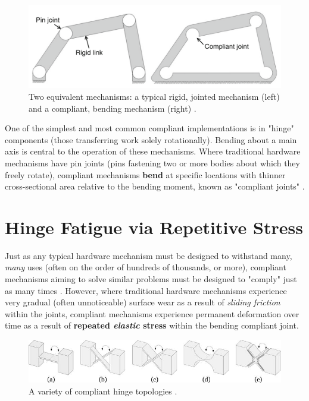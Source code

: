 \documentclass{report}
\begin{document}
\begin{figure}[h]
    \label{fig:wrench}
    \centering
    \includegraphics[width=\textwidth]{images/comparison.png}
    \hfill
    \caption{Two equivalent mechanisms: a typical rigid, jointed mechanism (left) and a compliant, bending mechanism (right) \cite{functionallygradedmaterials}.}
\end{figure}

One of the simplest and most common compliant implementations is in "hinge" components (those transferring work solely rotationally). Bending about a main axis is central to the operation of these mechanisms.
Where traditional hardware mechanisms have pin joints (pins fastening two or more bodies about which they freely rotate), compliant mechanisms \textbf{bend} at specific locations with thinner cross-sectional area relative to the bending moment, known as "compliant joints" \cite{compliant}. 

\pagebreak
\section{Hinge Fatigue via Repetitive Stress}

Just as any typical hardware mechanism must be designed to withstand many, \textit{many} uses (often on the order of hundreds of thousands, or more), compliant mechanisms aiming to solve similar problems 
must be designed to "comply" just as many times \cite{rotationalhinges}. However, where traditional hardware mechanisms experience very gradual (often unnoticeable) surface wear as a result of \textit{sliding friction} within the joints, compliant mechanisms experience permanent deformation over time
as a result of \textbf{repeated \textit{elastic} stress} within the bending compliant joint. 
\vspace{1cm}
\begin{figure}[h]
    \label{fig:latch}
    \centering
    \includegraphics[width=\textwidth]{images/hingetypes.png}
    \hfill
    \caption{A variety of compliant hinge topologies \cite{hingedesign}.}
\end{figure}
\end{document}

